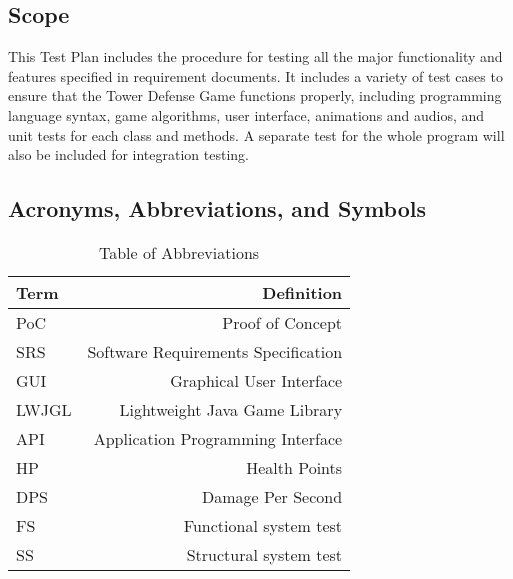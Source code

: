 \documentclass[12pt]{article}
\begin{document}
	\subsection{Scope}
	This Test Plan includes the procedure for testing all the major functionality and features specified in requirement documents. It includes a variety of test cases to ensure that the Tower Defense Game functions properly, including programming language syntax, game algorithms, user interface, animations and audios, and unit tests for each class and methods. A separate test for the whole program will also be included for integration testing.
	


    \newpage
	\subsection{Acronyms, Abbreviations, and Symbols}
	
	
	\begin{table}[!htbp]
	\centering

	\begin{tabular}[pos]{|l|r|}
		
		\hline
		\textbf{Term}& \textbf{Definition} \\ \hline
		PoC & Proof of Concept \\ \hline
		SRS & Software Requirements Specification \\ \hline
		GUI & Graphical User Interface \\ \hline
		LWJGL & Lightweight Java Game Library \\ \hline
		API & Application Programming Interface \\ \hline
		HP & Health Points \\ \hline
		DPS & Damage Per Second \\ \hline
		FS & Functional system test\\\hline
		SS & Structural system test\\
		\hline
	\end{tabular}
		\caption{Table of Abbreviations}
	\label{Table}
	\end{table}
\end{document}

